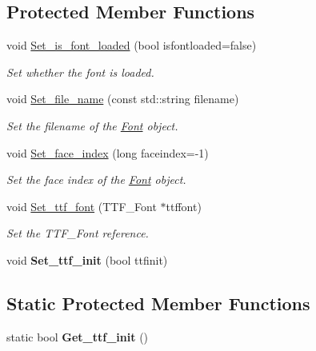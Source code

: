 \subsection*{Protected Member Functions}
\begin{DoxyCompactItemize}
\item 
void \hyperlink{classjetfuel_1_1draw_1_1Font_ac30b41dcdbdb87d103f0b976ac785560}{Set\+\_\+is\+\_\+font\+\_\+loaded} (bool isfontloaded=false)
\begin{DoxyCompactList}\small\item\em Set whether the font is loaded. \end{DoxyCompactList}\item 
void \hyperlink{classjetfuel_1_1draw_1_1Font_a42161bfb7213d0a5cbfb9dc4ad66348d}{Set\+\_\+file\+\_\+name} (const std\+::string filename)
\begin{DoxyCompactList}\small\item\em Set the filename of the \hyperlink{classjetfuel_1_1draw_1_1Font}{Font} object. \end{DoxyCompactList}\item 
void \hyperlink{classjetfuel_1_1draw_1_1Font_a0a8f47fbecce1093557f4d2e4c6266bf}{Set\+\_\+face\+\_\+index} (long faceindex=-\/1)
\begin{DoxyCompactList}\small\item\em Set the face index of the \hyperlink{classjetfuel_1_1draw_1_1Font}{Font} object. \end{DoxyCompactList}\item 
void \hyperlink{classjetfuel_1_1draw_1_1Font_a6238d89e07f1b9866c61ebd1ed26ef6a}{Set\+\_\+ttf\+\_\+font} (T\+T\+F\+\_\+\+Font $\ast$ttffont)
\begin{DoxyCompactList}\small\item\em Set the T\+T\+F\+\_\+\+Font reference. \end{DoxyCompactList}\item 
\mbox{\label{classjetfuel_1_1draw_1_1Font_af8d15fa128f23cec34841f06fb3ec911}} 
void {\bfseries Set\+\_\+ttf\+\_\+init} (bool ttfinit)
\end{DoxyCompactItemize}
\subsection*{Static Protected Member Functions}
\begin{DoxyCompactItemize}
\item 
\mbox{\label{classjetfuel_1_1draw_1_1Font_a20a6307ecb4da7363a877ad8786b6ff9}} 
static bool {\bfseries Get\+\_\+ttf\+\_\+init} ()
\end{DoxyCompactItemize}


